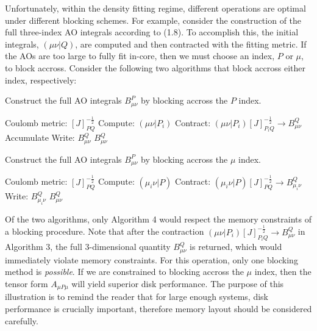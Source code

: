 Unfortunately, within the density fitting regime, different operations are optimal under different blocking schemes. For example,
consider the construction of the full three-index AO integrals according to (1.8). To accomplish this, 
the initial integrals, $(\mu \nu|Q)$, are computed and then contracted with the fitting metric. If the AOs are too large to fully 
fit in-core, then we must choose an index, $P$ or $\mu$, to block accross. Consider the following two algorithms
that block accross either index, respectively:

\begin{algorithm}[H]
\caption{Construct the full AO integrals $B_{\mu \nu}^P$ by blocking accross the $P$ index.}
\begin{algorithmic}
\REQUIRE Coulomb metric: $[J]_{PQ}^{-\frac{1}{2}}$
    \STATE Compute:  $(\mu \nu | P_i)$
    \STATE Contract: $(\mu \nu | P_i)[J]_{P_iQ}^{-\frac{1}{2}} \rightarrow B_{\mu \nu}^Q$
    \STATE Accumulate Write:    $B_{\mu \nu}^Q$
\ENDFOR
\RETURN $B_{\mu \nu}^Q$
\end{algorithmic}
\end{algorithm}

\begin{algorithm}[H]
\caption{Construct the full AO integrals $B_{\mu \nu}^P$ by blocking accross the $\mu$ index.}
\begin{algorithmic}
\REQUIRE Coulomb metric: $[J]_{PQ}^{-\frac{1}{2}}$
    \STATE Compute:  $(\mu_i \nu | P)$
    \STATE Contract: $(\mu_i \nu | P)[J]_{PQ}^{-\frac{1}{2}} \rightarrow B_{\mu_i \nu}^Q$
    \STATE Write:    $B_{\mu_i \nu}^Q$
\ENDFOR
\RETURN $B_{\mu \nu}^Q$
\end{algorithmic}
\end{algorithm}

Of the two algorithms, only Algorithm 4 would respect the memory constraints of a blocking procedure. Note that after the 
contraction $(\mu \nu | P_i)[J]_{P_iQ}^{-\frac{1}{2}} \rightarrow B_{\mu \nu}^Q$ in Algorithm 3, the full 3-dimensional quantity
$B_{\mu \nu}^Q$ is returned, which would immediately violate memory constraints. For this operation, only one blocking method is
\textit{possible}. If we are constrained to blocking accross the $\mu$ index, then the tensor form $A_{\mu P\mu}$ will yield
superior disk performance. The purpose of this illustration is to remind the reader that for large enough systems, disk performance
is crucially important, therefore memory layout should be considered carefully.

